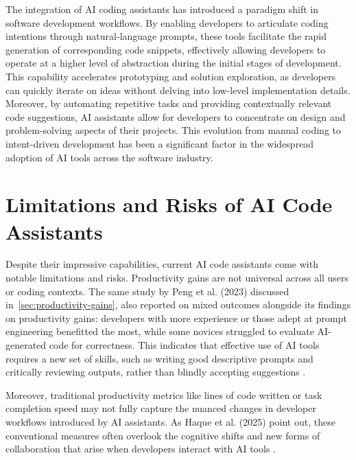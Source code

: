 The integration of \gls{AI} coding assistants has introduced a paradigm shift in software development workflows. By enabling developers to articulate coding intentions through natural-language prompts, these tools facilitate the rapid generation of corresponding code snippets, effectively allowing developers to operate at a higher level of abstraction during the initial stages of development. This capability accelerates prototyping and solution exploration, as developers can quickly iterate on ideas without delving into low-level implementation details. Moreover, by automating repetitive tasks and providing contextually relevant code suggestions, \gls{AI} assistants allow for developers to concentrate on design and problem-solving aspects of their projects. This evolution from manual coding to intent-driven development has been a significant factor in the widespread adoption of \gls{AI} tools across the software industry.

\section{Limitations and Risks of AI Code Assistants}
\label{sec:ai-limitations}
Despite their impressive capabilities, current \gls{AI} code assistants come with notable limitations and risks. Productivity gains are not universal across all users or coding contexts. The same study by Peng et al. (2023) discussed in~\ref{sec:productivity-gains}, also reported on mixed outcomes alongside its findings on productivity gains: developers with more experience or those adept at prompt engineering benefitted the most, while some novices struggled to evaluate \gls{AI}-generated code for correctness. This indicates that effective use of \gls{AI} tools requires a new set of skills, such as writing good descriptive prompts and critically reviewing outputs, rather than blindly accepting suggestions \autocite{Peng2023}.

Moreover, traditional productivity metrics like lines of code written or task completion speed may not fully capture the nuanced changes in developer workflows introduced by \gls{AI} assistants. As Haque et al. (2025) point out, these conventional measures often overlook the cognitive shifts and new forms of collaboration that arise when developers interact with \gls{AI} tools \autocite{Haque2025}.

